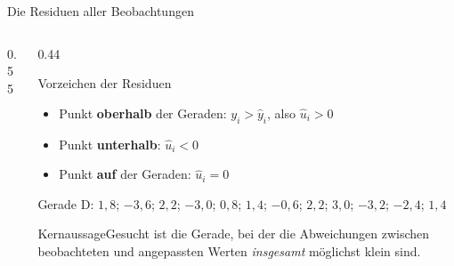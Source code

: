 \documentclass[aspectratio=169,11pt]{beamer}
\newcommand{\kernaussage}[1]{\begin{alertblock}{Kernaussage}#1\end{alertblock}}
\def\werbelist{1/33,3/30,4/37,5/33,6/38,8/41,8/39,9/43,10/45,11/40,12/42,13/47}
\newcommand{\werbepunkte}{\addplot[only marks, mark=*, mark size=2.2pt, color=hsbiblue]
  coordinates {(1,33) (3,30) (4,37) (5,33) (6,38) (8,41) (8,39) (9,43) (10,45) (11,40) (12,42) (13,47)};}
\newcommand{\residuenvon}[4]{%
  \foreach \px/\py in #1 {%
    \pgfmathsetmacro{\yh}{#2 + #3*\px}%
    \edef\tmpdraw{\noexpand\draw[#4] (axis cs:\px,\py) -- (axis cs:\px,\yh);}%
    \tmpdraw
  }}
\begin{document}
\begin{frame}{Die Residuen aller Beobachtungen}
  \begin{columns}[T]
    \begin{column}{0.55\textwidth}
    \end{column}
    \begin{column}{0.44\textwidth}
      \small
      \begin{block}{Vorzeichen der Residuen}
        \begin{itemize}
          \item Punkt \textbf{oberhalb} der Geraden: $y_i > \hat{y}_i$, also $\hat{u}_i > 0$
          \item Punkt \textbf{unterhalb}: $\hat{u}_i < 0$
          \item Punkt \textbf{auf} der Geraden: $\hat{u}_i = 0$
        \end{itemize}
        Gerade D: $1{,}8$; $-3{,}6$; $2{,}2$; $-3{,}0$; $0{,}8$; $1{,}4$; $-0{,}6$; $2{,}2$;
        $3{,}0$; $-3{,}2$; $-2{,}4$; $1{,}4$
      \end{block}
      \kernaussage{Gesucht ist die Gerade, bei der die Abweichungen zwischen
        beobachteten und angepassten Werten \emph{insgesamt} möglichst klein sind.}
    \end{column}
  \end{columns}
\end{frame}
\end{document}
